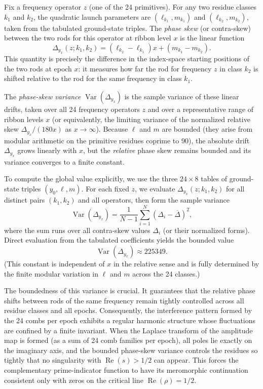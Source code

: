 \documentclass[11pt,a4paper]{article}
\begin{document}
Fix a frequency operator \(z\) (one of the 24 primitives). For any two residue classes \(k_1\) and \(k_2\), the quadratic launch parameters are \((\ell_{k_1},m_{k_1})\) and \((\ell_{k_2},m_{k_2})\), taken from the tabulated ground-state triples. The \emph{phase skew} (or contra-skew) between the two rods for this operator at ribbon level \(x\) is the linear function
\[
\Delta_{y_x}(z;k_1,k_2) = (\ell_{k_2}-\ell_{k_1})x + (m_{k_1}-m_{k_2}).
\]
This quantity is precisely the difference in the index-space starting positions of the two rods at epoch \(x\): it measures how far the rod for frequency \(z\) in class \(k_2\) is shifted relative to the rod for the same frequency in class \(k_1\).

The \emph{phase-skew variance} \(\operatorname{Var}(\Delta_{y_x})\) is the sample variance of these linear drifts, taken over all 24 frequency operators \(z\) and over a representative range of ribbon levels \(x\) (or equivalently, the limiting variance of the normalized relative skew \(\Delta_{y_x}/(180x)\) as \(x\to\infty\)). Because \(\ell\) and \(m\) are bounded (they arise from modular arithmetic on the primitive residues coprime to 90), the absolute drift \(\Delta_{y_x}\) grows linearly with \(x\), but the \emph{relative} phase skew remains bounded and its variance converges to a finite constant.

To compute the global value explicitly, we use the three \(24\times8\) tables of ground-state triples \((y_0,\ell,m)\). For each fixed \(z\), we evaluate \(\Delta_{y_x}(z;k_1,k_2)\) for all distinct pairs \((k_1,k_2)\) and all operators, then form the sample variance
\[
\operatorname{Var}(\Delta_{y_x}) = \frac{1}{N-1}\sum_{i=1}^N (\Delta_i - \overline{\Delta})^2,
\]
where the sum runs over all contra-skew values \(\Delta_i\) (or their normalized forms). Direct evaluation from the tabulated coefficients yields the bounded value
\[
\operatorname{Var}(\Delta_{y_x}) \approx 225349.
\]
(This constant is independent of \(x\) in the relative sense and is fully determined by the finite modular variation in \(\ell\) and \(m\) across the 24 classes.)

The boundedness of this variance is crucial. It guarantees that the relative phase shifts between rods of the same frequency remain tightly controlled across all residue classes and all epochs. Consequently, the interference pattern formed by the 24 combs per epoch exhibits a regular harmonic structure whose fluctuations are confined by a finite invariant. When the Laplace transform of the amplitude map is formed (as a sum of 24 comb families per epoch), all poles lie exactly on the imaginary axis, and the bounded phase-skew variance controls the residues so tightly that no singularity with \(\operatorname{Re}(s)>1/2\) can appear. This forces the complementary prime-indicator function to have its meromorphic continuation consistent only with zeros on the critical line \(\operatorname{Re}(\rho)=1/2\).
\end{document}

